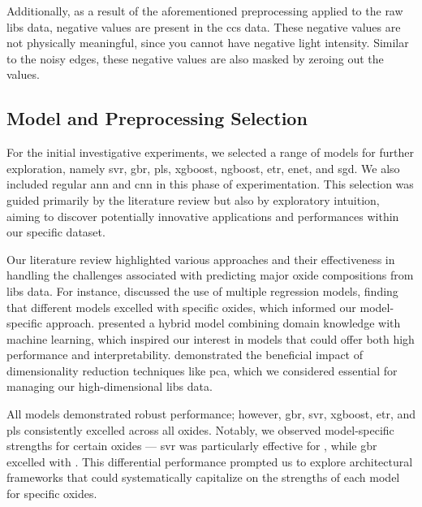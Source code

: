 Additionally, as a result of the aforementioned preprocessing applied to the raw \gls{libs} data, negative values are present in the \gls{ccs} data.
These negative values are not physically meaningful, since you cannot have negative light intensity.
Similar to the noisy edges, these negative values are also masked by zeroing out the values.

\subsection{Model and Preprocessing Selection}
For the initial investigative experiments, we selected a range of models for further exploration, namely \gls{svr}, \gls{gbr}, \gls{pls}, \gls{xgboost}, \gls{ngboost}, \gls{etr}, \gls{enet}, and \gls{sgd}.
We also included regular \gls{ann} and \gls{cnn} in this phase of experimentation.
This selection was guided primarily by the literature review but also by exploratory intuition, aiming to discover potentially innovative applications and performances within our specific dataset.

Our literature review highlighted various approaches and their effectiveness in handling the challenges associated with predicting major oxide compositions from \gls{libs} data.
For instance, \citet{andersonImprovedAccuracyQuantitative2017} discussed the use of multiple regression models, finding that different models excelled with specific oxides, which informed our model-specific approach.
\citet{song_DF-K-ELM} presented a hybrid model combining domain knowledge with machine learning, which inspired our interest in models that could offer both high performance and interpretability. \citet{rezaei_dimensionality_reduction} demonstrated the beneficial impact of dimensionality reduction techniques like \gls{pca}, which we considered essential for managing our high-dimensional \gls{libs} data.

All models demonstrated robust performance; however, \gls{gbr}, \gls{svr}, \gls{xgboost}, \gls{etr}, and \gls{pls} consistently excelled across all oxides.
Notably, we observed model-specific strengths for certain oxides --- \gls{svr} was particularly effective for , while \gls{gbr} excelled with .
This differential performance prompted us to explore architectural frameworks that could systematically capitalize on the strengths of each model for specific oxides.

